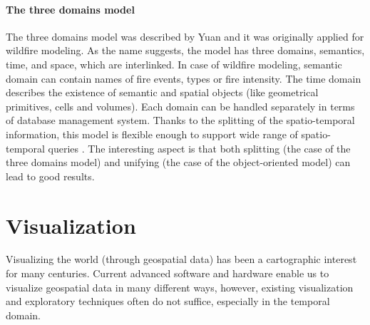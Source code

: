 \documentclass[a4paper,12pt]{book}
\begin{document}
\paragraph{The three domains model}
The three domains model was described by Yuan \cite{yuan1994wildfire} and it was originally applied for wildfire modeling.
As the name suggests, the model has three domains, semantics, time, and space, which are interlinked.
In case of wildfire modeling, semantic domain can contain names of fire events, types or fire intensity.
The time domain describes the existence of semantic and spatial objects (like geometrical primitives, cells and volumes).
Each domain can be handled separately in terms of database management system.
Thanks to the splitting of the spatio-temporal information,
this model is flexible enough to support wide range of spatio-temporal queries \cite{pelekis2004}.
The interesting aspect is that both splitting (the case of the three domains model)
and unifying (the case of the object-oriented model) can lead to good results.


\section{Visualization}
Visualizing the world (through geospatial data) has been a cartographic interest for many centuries.
Current advanced software and hardware enable us to visualize geospatial data in many different ways,
however, existing visualization and exploratory techniques often do not suffice, especially in the temporal domain.
\end{document}
